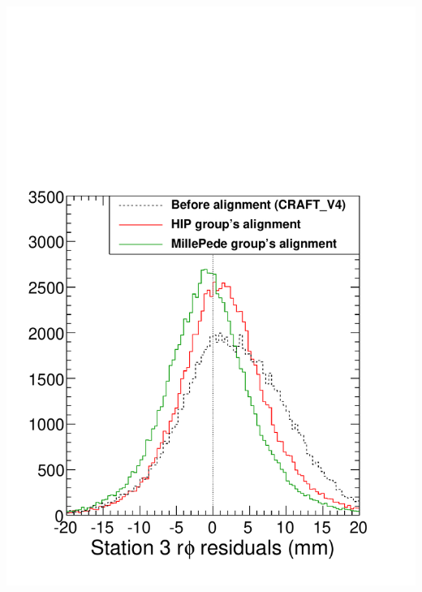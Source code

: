 \documentclass[compress]{beamer}
\begin{document}
\begin{frame}
\begin{columns}
\includegraphics[width=\linewidth]{raw_station3.pdf}


\end{columns}
\end{frame}
\end{document}
